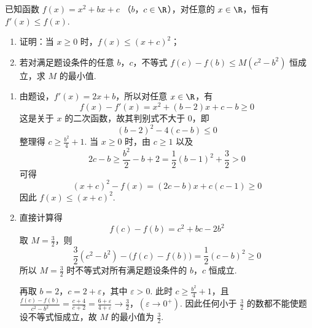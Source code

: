 \begin{problem}
已知函数 \( f(x) = x^2 + bx + c \) （\(b\)，\(c \in \R\)），对任意的 \( x \in \R \)，恒有 \( f'(x) \leqslant f(x) \).

\begin{enumerate}
\item 证明：当 \(x \geqslant 0\) 时，\(f(x) \leqslant (x + c)^2\)；
\item 若对满足题设条件的任意 \(b\)，\(c\)，不等式 \(f(c) - f(b) \leqslant M (c^2 - b^2)\) 恒成立，求 \(M\) 的最小值.
\end{enumerate}

\begin{solution}
\begin{enumerate}
\item 由题设，\(f'(x)=2x+b\)，所以对任意 \(x\in\R\)，有
\[
f(x)-f'(x)=x^2+(b-2)x+c-b\geqslant0
\]
这是关于 \(x\) 的二次函数，故其判别式不大于 \(0\)，即
\[
(b-2)^2-4(c-b)\leqslant0
\]
整理得 \(c\geqslant\frac{b^2}{4}+1\). 当 \(x\geqslant0\) 时，由 \(c\geqslant1\) 以及
\[
2c-b\geqslant\frac{b^2}{2}-b+2=\frac{1}{2}(b-1)^2+\frac{3}{2}>0
\]
可得
\[
(x+c)^2-f(x)=(2c-b)x+c(c-1)\geqslant0
\]
因此 \(f(x)\leqslant(x+c)^2\).
\item 直接计算得
\[
f(c)-f(b)=c^2+bc-2b^2
\]
取 \(M=\frac{3}{2}\)，则
\[
\frac{3}{2}(c^2-b^2)-\bigl(f(c)-f(b)\bigr)=\frac{1}{2}(c-b)^2\geqslant0
\]
所以 \(M=\frac{3}{2}\) 时不等式对所有满足题设条件的 \(b\)，\(c\) 恒成立.

再取 \(b=2\)，\(c=2+\varepsilon\)，其中 \(\varepsilon>0\). 此时 \(c\geqslant\frac{b^2}{4}+1\)，且
\(\frac{f(c)-f(b)}{c^2-b^2}=\frac{c+4}{c+2}=\frac{6+\varepsilon}{4+\varepsilon}\longrightarrow\frac{3}{2}\)，\(\left(\varepsilon\to0^+\right)\).
因此任何小于 \(\frac{3}{2}\) 的数都不能使题设不等式恒成立，故 \(M\) 的最小值为 \(\frac{3}{2}\).
\end{enumerate}
\end{solution}
\end{problem}

